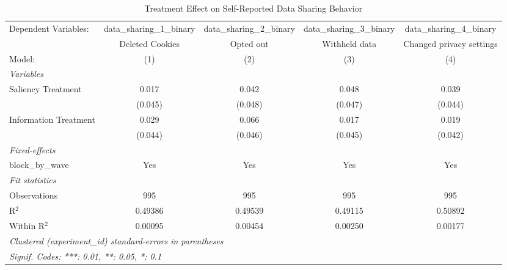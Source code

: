 
\begin{table}[htbp]
   \caption{Treatment Effect on Self-Reported Data Sharing Behavior}
   \centering
   \begin{tabular}{lcccc}
      \tabularnewline \midrule \midrule
      Dependent Variables:  & data\_sharing\_1\_binary    & data\_sharing\_2\_binary    & data\_sharing\_3\_binary    & data\_sharing\_4\_binary\\     
                            & Deleted Cookies             & Opted out                   & Withheld data               & Changed privacy settings \\   
      Model:                & (1)                         & (2)                         & (3)                         & (4)\\  
      \midrule
      \emph{Variables}\\
      Saliency Treatment    & 0.017                       & 0.042                       & 0.048                       & 0.039\\   
                            & (0.045)                     & (0.048)                     & (0.047)                     & (0.044)\\   
      Information Treatment & 0.029                       & 0.066                       & 0.017                       & 0.019\\   
                            & (0.044)                     & (0.046)                     & (0.045)                     & (0.042)\\   
      \midrule
      \emph{Fixed-effects}\\
      block\_by\_wave       & Yes                         & Yes                         & Yes                         & Yes\\  
      \midrule
      \emph{Fit statistics}\\
      Observations          & 995                         & 995                         & 995                         & 995\\  
      R$^2$                 & 0.49386                     & 0.49539                     & 0.49115                     & 0.50892\\  
      Within R$^2$          & 0.00095                     & 0.00454                     & 0.00250                     & 0.00177\\  
      \midrule \midrule
      \multicolumn{5}{l}{\emph{Clustered (experiment\_id) standard-errors in parentheses}}\\
      \multicolumn{5}{l}{\emph{Signif. Codes: ***: 0.01, **: 0.05, *: 0.1}}\\
   \end{tabular}
\end{table}


